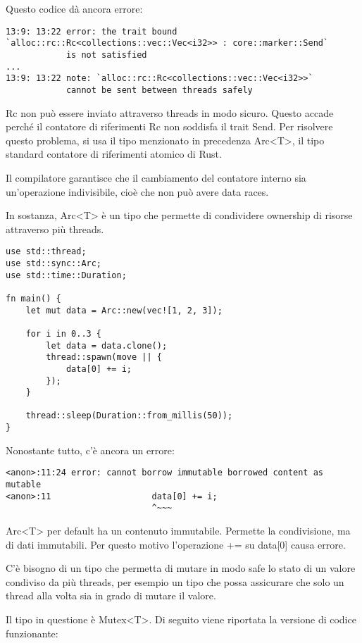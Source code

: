 Questo codice dà ancora errore:

\begin{lstlisting}
13:9: 13:22 error: the trait bound
`alloc::rc::Rc<collections::vec::Vec<i32>> : core::marker::Send`
            is not satisfied
...
13:9: 13:22 note: `alloc::rc::Rc<collections::vec::Vec<i32>>`
            cannot be sent between threads safely
\end{lstlisting}

Rc non può essere inviato attraverso threads in modo sicuro.
Questo accade perché il contatore di riferimenti Rc non soddisfa il trait Send.
Per risolvere questo problema, si usa il tipo menzionato in precedenza Arc<T>,
il tipo standard  contatore di riferimenti atomico di Rust.

Il compilatore garantisce che il cambiamento del contatore interno sia
un'operazione indivisibile, cioè che non può avere data races.

In sostanza, Arc<T> è un tipo che permette di condividere ownership di risorse
attraverso più threads.

\begin{lstlisting}
use std::thread;
use std::sync::Arc;
use std::time::Duration;

fn main() {
    let mut data = Arc::new(vec![1, 2, 3]);

    for i in 0..3 {
        let data = data.clone();
        thread::spawn(move || {
            data[0] += i;
        });
    }

    thread::sleep(Duration::from_millis(50));
}
\end{lstlisting}

Nonostante tutto, c’è ancora un errore:

\begin{lstlisting}
<anon>:11:24 error: cannot borrow immutable borrowed content as mutable
<anon>:11                    data[0] += i;
                             ^~~~
\end{lstlisting}

Arc<T> per default ha un contenuto immutabile. Permette la condivisione, ma di
dati immutabili. Per questo motivo l'operazione += su data[0] causa errore.

C'è bisogno di un tipo che permetta di mutare in modo safe lo stato
di un valore condiviso da più threads, per esempio un tipo che possa assicurare
che solo un thread alla volta sia in grado di mutare il valore.

Il tipo in questione è Mutex<T>. Di seguito viene riportata la versione di
codice funzionante:

